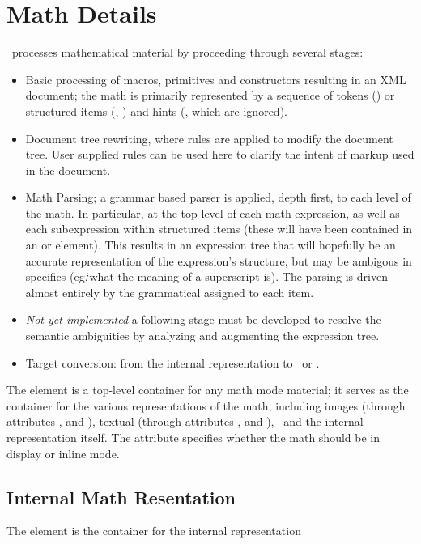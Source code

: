 \documentclass{report}
\begin{document}
\section{Math Details}\label{math.details}
\LaTeXML\ processes mathematical material by proceeding through several stages:
\begin{itemize}
\item Basic processing of macros, primitives and constructors resulting in
   an XML document; the math is primarily represented by a sequence of
   tokens () or structured items (, ) and
   hints (, which are ignored).
\item Document tree rewriting, where rules are applied to modify the document tree.
   User supplied rules can be used here to clarify the intent of markup used in the document.
\item Math Parsing; a grammar based parser is applied, depth first, to each level of the math.
   In particular, at the top level of each math expression, as well as each
   subexpression within structured items (these will have been contained in
   an  or  element).  This results in an expression tree
   that will hopefully be an accurate representation of the expression's structure,
   but may be ambigous in specifics (eg.`what the meaning of a superscript is).
   The parsing is driven almost entirely by the grammatical  assigned
   to each item.
\item \emph{Not yet implemented} a following stage must be developed to resolve
   the semantic ambiguities by analyzing and augmenting the expression tree.
\item Target conversion: from the internal  representation to
   \MathML\ or \OpenMath.
\end{itemize}

The  element is a top-level container for any math mode material; it
serves as the container for the various representations of the math, including
images (through attributes ,  and ), 
textual (through attributes ,  and ),
\MathML\ and the internal representation itself.  
The  attribute specifies whether the math should be in display or inline mode.

\subsection{Internal Math Resentation}\label{math.details.representation}
The  element is the container for the internal representation
\end{document}
